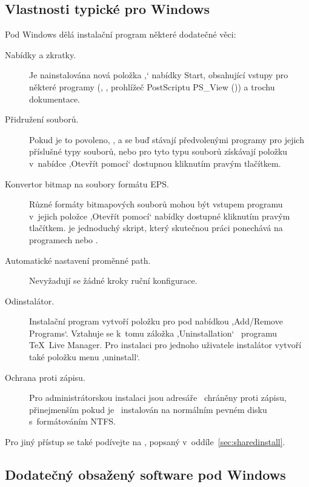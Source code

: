 \documentclass[\classoptions,slovak,english,czech]{\classname}
\newcommand{\singleuv}[1]{,#1`}
\begin{document}
\subsection{Vlastnosti typické pro Windows}  %
\label{sec:winfeatures}
Pod Windows dělá instalační program některé dodatečné věci:
\begin{description}
\item[Nabídky a zkratky.] Je nainstalována nová položka \singleuv{\TL{}} nabídky
  Start, obsahující vstupy pro některé programy \GUI{} 
  (, , prohlížeč PostScriptu PS\_View ())
  a trochu dokumentace. 
\item[Přidružení souborů.] Pokud je to povoleno, , 
  a  se buď stávají předvolenými programy pro jejich příslušné
  typy souborů, nebo pro tyto typu souborů získávají položku v~nabídce 
  \singleuv{Otevřít pomocí} dostupnou kliknutím pravým tlačítkem.
\item[Konvertor bitmap na soubory formátu EPS.] Různé formáty
  bitmapových souborů mohou být vstupem programu
   v~jejich položce \singleuv{Otevřít pomocí}
  nabídky dostupné kliknutím pravým tlačítkem.  
  je jednoduchý skript, který skutečnou práci ponechává 
  na programech  nebo .
\item[Automatické nastavení proměnné path.] Nevyžadují se žádné
   kroky ruční konfigurace.
\item[Odinstalátor.] Instalační program vytvoří položku 
  pro \TL{} pod nabídkou \singleuv{Add/Remove 
  Programs}. Vztahuje se k~tomu záložka \singleuv{Uninstallation} \GUI\ 
  programu \TeX\ Live Manager. Pro instalaci pro jednoho uživatele
 instalátor vytvoří také položku menu \singleuv{uninstall}.
\item[Ochrana proti zápisu.] Pro administrátorskou instalaci jsou adresáře 
\TL\ chráněny proti zápisu, přinejmenším pokud je \TL\ instalován na normálním
pevném disku %
s~formátováním NTFS.
\end{description}


Pro jiný přístup se také podívejte na , 
popsaný v~oddíle~\ref{sec:sharedinstall}.


\subsection{Dodatečný obsažený software pod Windows}
\end{document}
